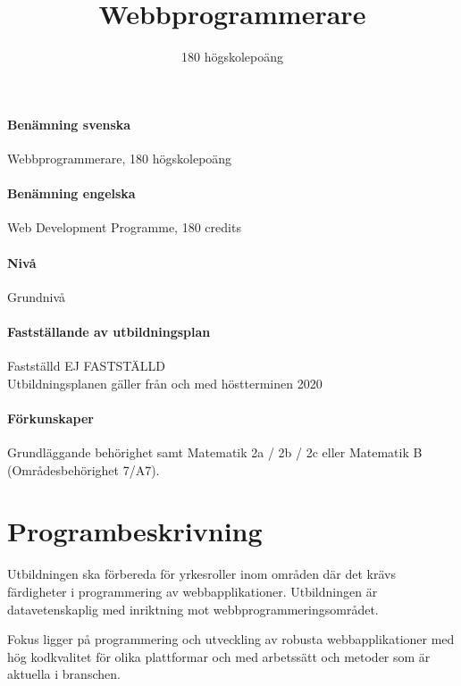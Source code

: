 \documentclass[swedish]{LnuCmThesis}
\title{Webbprogrammerare}
\subtitle{180 högskolepoäng}
\begin{document}
\maketitle

\paragraph{Benämning svenska}

Webbprogrammerare, 180 högskolepoäng

\paragraph{Benämning engelska}

Web Development Programme, 180 credits

\paragraph{Nivå}

Grundnivå

\paragraph{Fastställande av utbildningsplan}

Fastställd EJ FASTSTÄLLD\\
Utbildningsplanen gäller från och med höstterminen 2020

\paragraph{Förkunskaper}

Grundläggande behörighet samt Matematik 2a / 2b / 2c eller Matematik B\\
(Områdesbehörighet 7/A7).

\section*{Programbeskrivning}

Utbildningen ska förbereda för yrkesroller inom områden där det krävs färdigheter i programmering av webbapplikationer. Utbildningen är datavetenskaplig med inriktning mot webbprogrammeringsområdet.

Fokus ligger på programmering och utveckling av robusta webbapplikationer med hög kodkvalitet för olika plattformar och med arbetssätt och metoder som är aktuella i branschen. 
\end{document}
